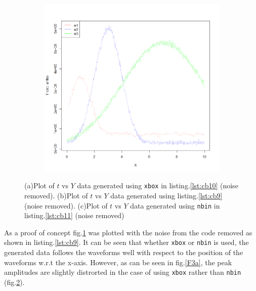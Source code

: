 \documentclass{article}
\begin{document}
\begin{figure}[h]
\begin{subfigure}[t]{0.32\textwidth}
		\label{F3b}
	\end{subfigure}
	\hfill
	\begin{subfigure}[t]{0.32\textwidth}
		\centering
		\includegraphics[width=\linewidth]{Proof_Concept_noiseless_list_nbin.png}
		\label{F3c}
	\end{subfigure}	
	\caption{(a)Plot of $t$ vs $Y$ data generated using \lstinline[language=R]|xbox| in listing.\ref{lst:cb10} (noise removed). (b)Plot of $t$ vs $Y$ data generated using listing.\ref{lst:cb9} (noise removed). (c)Plot of $t$ vs $Y$ data generated using \lstinline[language=R]|nbin| in listing.\ref{lst:cb11} (noise removed)}\label{F3}
\end{figure}
As a proof of concept fig.\ref{F3b} was plotted with the noise from the code removed as shown in listing.\ref{lst:cb9}. It can be seen that whether \lstinline[language=R]|xbox| or \lstinline[language=R]|nbin| is used, the generated data follows the waveforms well with respect to the position of the waveforms w.r.t the x-axis. However, as can be seen in fig.\ref{F3a}, the peak amplitudes are slightly distrorted in the case of using \lstinline[language=R]|xbox| rather than \lstinline[language=R]|nbin| (fig.\ref{F3c}).
\end{document}
